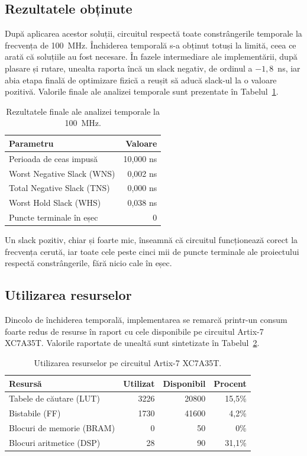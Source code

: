 \subsection{Rezultatele obținute}

După aplicarea acestor soluții, circuitul respectă toate constrângerile temporale la
frecvența de 100~MHz. Închiderea temporală s-a obținut totuși la limită, ceea ce arată
că soluțiile au fost necesare. În fazele intermediare ale implementării, după plasare
și rutare, unealta raporta încă un slack negativ, de ordinul a $-1{,}8$~ns, iar abia
etapa finală de optimizare fizică a reușit să aducă slack-ul la o valoare pozitivă.
Valorile finale ale analizei temporale sunt prezentate în Tabelul~\ref{tab:timing}.

\begin{table}[H]
\centering
\caption{Rezultatele finale ale analizei temporale la 100~MHz.}
\label{tab:timing}
\begin{tabular}{l r}
\toprule
\textbf{Parametru} & \textbf{Valoare} \\
\midrule
Perioada de ceas impusă & 10,000 ns \\
Worst Negative Slack (WNS) & 0,002 ns \\
Total Negative Slack (TNS) & 0,000 ns \\
Worst Hold Slack (WHS) & 0,038 ns \\
Puncte terminale în eșec & 0 \\
\bottomrule
\end{tabular}
\end{table}

Un slack pozitiv, chiar și foarte mic, înseamnă că circuitul funcționează corect la
frecvența cerută, iar toate cele peste cinci mii de puncte terminale ale proiectului
respectă constrângerile, fără nicio cale în eșec.

\subsection{Utilizarea resurselor}

Dincolo de închiderea temporală, implementarea se remarcă printr-un consum foarte
redus de resurse în raport cu cele disponibile pe circuitul Artix-7 XC7A35T. Valorile
raportate de unealtă sunt sintetizate în Tabelul~\ref{tab:utilizare}.

\begin{table}[H]
\centering
\caption{Utilizarea resurselor pe circuitul Artix-7 XC7A35T.}
\label{tab:utilizare}
\begin{tabular}{l r r r}
\toprule
\textbf{Resursă} & \textbf{Utilizat} & \textbf{Disponibil} & \textbf{Procent} \\
\midrule
Tabele de căutare (LUT) & 3226 & 20800 & 15,5\% \\
Bistabile (FF) & 1730 & 41600 & 4,2\% \\
Blocuri de memorie (BRAM) & 0 & 50 & 0\% \\
Blocuri aritmetice (DSP) & 28 & 90 & 31,1\% \\
\bottomrule
\end{tabular}
\end{table}


